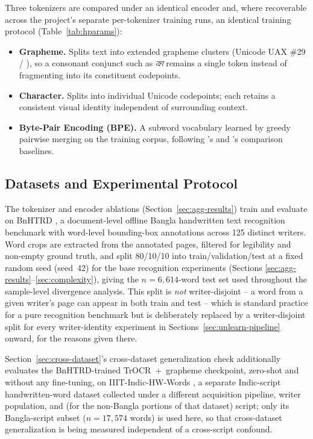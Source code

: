 \documentclass[a4paper,fleqn]{cas-dc}
\begin{document}
Three tokenizers are compared under an identical encoder and, where
recoverable across the project's separate per-tokenizer training runs,
an identical training protocol (Table~\ref{tab:hparams}):

\begin{itemize}
\item \textbf{Grapheme.} Splits text into extended grapheme clusters
  (Unicode UAX \#29 / \citealt{alam2021graphemes}), so a consonant
  conjunct such as \textit{ক্রা} remains a single token instead of
  fragmenting into its constituent codepoints.
\item \textbf{Character.} Splits into individual Unicode codepoints; each
  retains a consistent visual identity independent of surrounding context.
\item \textbf{Byte-Pair Encoding (BPE).} A subword vocabulary learned by
  greedy pairwise merging on the training corpus, following
  \citet{basher2023bngraphemizer}'s and \citet{hasan2025gradet}'s
  comparison baselines.
\end{itemize}

\subsection{Datasets and Experimental Protocol}
\label{sec:data}

The tokenizer and encoder ablations (Section~\ref{sec:agg-results}) train
and evaluate on BnHTRD \citep{rahman2023bnhtrd}, a document-level offline
Bangla handwritten text recognition benchmark with word-level bounding-box
annotations across 125 distinct writers. Word crops are extracted from
the annotated pages, filtered for legibility and non-empty ground truth,
and split 80/10/10 into train/validation/test at a fixed random seed
(seed~42) for the base recognition experiments (Sections
\ref{sec:agg-results}--\ref{sec:complexity}), giving the $n=6{,}614$-word
test set used throughout the sample-level divergence analysis. This split
is \emph{not} writer-disjoint -- a word from a given writer's page can
appear in both train and test -- which is standard practice for a pure
recognition benchmark but is deliberately replaced by a writer-disjoint
split for every writer-identity experiment in
Sections~\ref{sec:unlearn-pipeline} onward, for the reasons given there.

Section~\ref{sec:cross-dataset}'s cross-dataset generalization check
additionally evaluates the BnHTRD-trained TrOCR~+~grapheme checkpoint,
zero-shot and without any fine-tuning, on IIIT-Indic-HW-Words
\citep{gongidi2021iiitindic}, a separate Indic-script handwritten-word
dataset collected under a different acquisition pipeline, writer
population, and (for the non-Bangla portions of that dataset) script; only
its Bangla-script subset ($n=17{,}574$ words) is used here, so that
cross-dataset generalization is being measured independent of a
cross-script confound.
\end{document}
